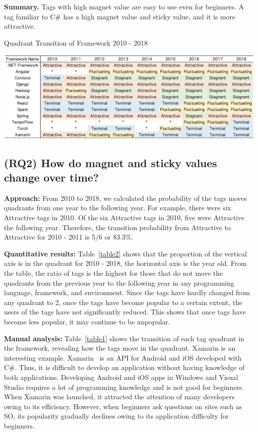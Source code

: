 \documentclass[english,preprint,JIP,technote]{ipsj}
\begin{document}
\noindent \textbf{Summary.}
 Tags with high magnet value are easy to use even for beginners. A tag familiar to C# has a high magnet value and sticky value, and it is more attractive.

\begin{table}[t]
 \centering
 \caption{Quadrant Transition of Framework 2010 - 2018} 
 \includegraphics[width=1.0\hsize]{img/frame2010-2018.eps} 
 \label{table1} 
\end{table}

\subsection{(RQ2) How do magnet and sticky values change over time?} 

\noindent \textbf{Approach:}
From 2010 to 2018, we calculated the probability of the tags moves quadrants from one year to the following year. For example, there were six Attractive tags in 2010. Of the six Attractive tags in 2010, five were Attractive the following year. Therefore, the transition probability from Attractive to Attractive for 2010 - 2011 is 5/6 or 83.3\%. 

\noindent \textbf{Quantitative results:}
Table~\ref{table2} shows that the proportion of the vertical axis is in the quadrant for 2010 - 2018, the horizontal axis is the year old. From the table, the ratio of tags is the highest for those that do not move the quadrants from the previous year to the following year in any programming language, framework, and environment. Since the tags have hardly changed from any quadrant to 2, once the tags have become popular to a certain extent, the users of the tags have not significantly reduced. This shows that once tags have become less popular, it may continue to be unpopular.

\noindent \textbf{Manual analysis:}
Table~\ref{table1} shows the transition of each tag quadrant in the framework, revealing how the tags move in the quadrant. Xamarin is an interesting example. Xamarin~\cite{reynolds2014xamarin} is an API for Android and iOS developed with C\#. Thus, it is difficult to develop an application without having knowledge of both applications. Developing Android and iOS apps in Windows and Visual Studio requires a lot of programming knowledge and is not good for beginners. When Xamarin was launched, it attracted the attention of many developers owing to its efficiency. However, when beginners ask questions on sites such as SO, its popularity gradually declines owing to its application difficulty for beginners.
\end{document}

